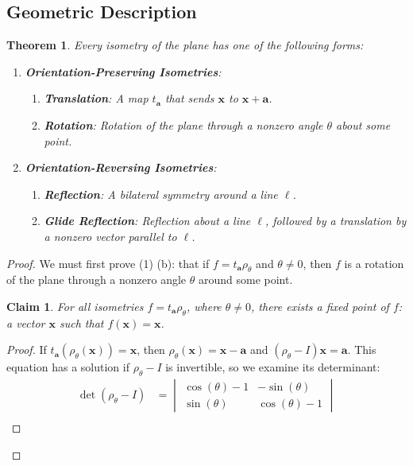 \documentclass[11pt]{article}
\renewcommand{\vec}[1]{\mathbf{#1}}
\newtheorem{theorem}{Theorem}
\newtheorem{claim}{Claim}
\begin{document}
\subsection{Geometric Description}

\begin{adjustwidth}{1cm}{}
	\begin{theorem}
		Every isometry of the plane has one of the following forms:
		\begin{enumerate}
			\item \textbf{Orientation-Preserving Isometries}:
			\begin{enumerate}
				\item \textbf{Translation}: A map $t_{\vec{a}}$ that sends $\vec{x}$ to $\vec{x} + \vec{a}$.
				\item \textbf{Rotation}: Rotation of the plane through a nonzero angle $\theta$ about some point.
			\end{enumerate}
			\item \textbf{Orientation-Reversing Isometries}:
			\begin{enumerate}
				\item \textbf{Reflection}: A bilateral symmetry around a line $\ell$.
				\item \textbf{Glide Reflection}: Reflection about a line $\ell$, followed by a translation by a nonzero vector parallel to $\ell$.
			\end{enumerate}
		\end{enumerate}
	\end{theorem}
	\begin{proof}
		We must first prove (1) (b): that if $f = t_{\vec{a}} \rho_{\theta}$ and $\theta \ne 0$, then $f$ is a rotation of the plane through a nonzero angle $\theta$ around some point.
		\begin{adjustwidth}{1cm}{}
			\begin{claim}
				For all isometries $f = t_{\vec{a}} \rho_{\theta}$, where $\theta \ne 0$, there exists a fixed point of $f$: a vector $\vec{x}$ such that $f(\vec{x}) = \vec{x}$.
			\end{claim}
			\begin{proof}\renewcommand{\qedsymbol}{}
				If $t_{\vec{a}}(\rho_{\theta}(\vec{x})) = \vec{x}$, then $\rho_{\theta}(\vec{x}) = \vec{x} - \vec{a}$ and $(\rho_{\theta} - I) \vec{x} = \vec{a}$. This equation has a solution if $\rho_{\theta} - I$ is invertible, so we examine its determinant:
				\begin{align*}
					\det(\rho_{\theta} - I) &= \begin{vmatrix} \cos(\theta) - 1 & -\sin(\theta) \\ \sin(\theta) & \cos(\theta) - 1 \end{vmatrix} \\

\end{align*}
\end{proof}
\end{adjustwidth}
\end{proof}
\end{adjustwidth}
\end{document}
